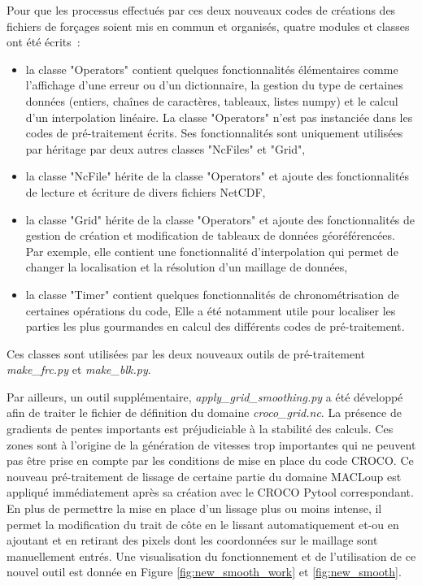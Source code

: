 \documentclass[10pt,a4paper,titlepage]{article}
\begin{document}
    Pour que les processus effectués par ces deux nouveaux codes de créations des fichiers de forçages soient mis en commun et organisés, quatre modules et classes ont été écrits~:
    \begin{itemize}
        \item la classe "Operators" contient quelques fonctionnalités élémentaires comme l'affichage d'une erreur ou d'un dictionnaire, la gestion du type de certaines données (entiers, chaînes de caractères, tableaux, listes numpy) et le calcul d'un interpolation linéaire.
        La classe "Operators" n'est pas instanciée dans les codes de pré-traitement écrits.
        Ses fonctionnalités sont uniquement  utilisées par héritage par deux autres classes "NcFiles" et "Grid",
        \item la classe "NcFile" hérite de la classe "Operators" et ajoute des fonctionnalités de lecture et écriture de divers fichiers NetCDF,
        \item la classe "Grid" hérite de la classe "Operators" et ajoute des fonctionnalités de gestion de création et modification de tableaux de données géoréférencées.
        Par exemple, elle contient une fonctionnalité d'interpolation qui permet de changer la localisation et la résolution d'un maillage de données,
        \item la classe "Timer" contient quelques fonctionnalités de chronométrisation de certaines opérations du code,
        Elle a été notamment utile pour localiser les parties les plus gourmandes en calcul des différents codes de pré-traitement.
    \end{itemize}
    Ces classes sont utilisées par les deux nouveaux outils de pré-traitement \textit{make\_frc.py} et \textit{make\_blk.py}.
    
    Par ailleurs, un outil supplémentaire, \textit{apply\_grid\_smoothing.py} a été développé afin de traiter le fichier de définition du domaine \textit{croco\_grid.nc}.
    La présence de gradients de pentes importants est préjudiciable à la stabilité des calculs. Ces zones sont à l'origine de la génération de vitesses trop importantes qui ne peuvent pas être prise en compte par les conditions de mise en place du code CROCO.
    Ce nouveau pré-traitement de lissage de certaine partie du domaine MACLoup est appliqué immédiatement après sa création avec le CROCO Pytool correspondant.
    En plus de permettre la mise en place d'un lissage plus ou moins intense, il permet la modification du trait de côte en le lissant automatiquement et-ou en ajoutant et en retirant des pixels dont les coordonnées sur le maillage sont manuellement entrés.
    Une visualisation du fonctionnement et de l'utilisation de ce nouvel outil est donnée en Figure \ref{fig:new_smooth_work} et \ref{fig:new_smooth}.
    
\end{document}
